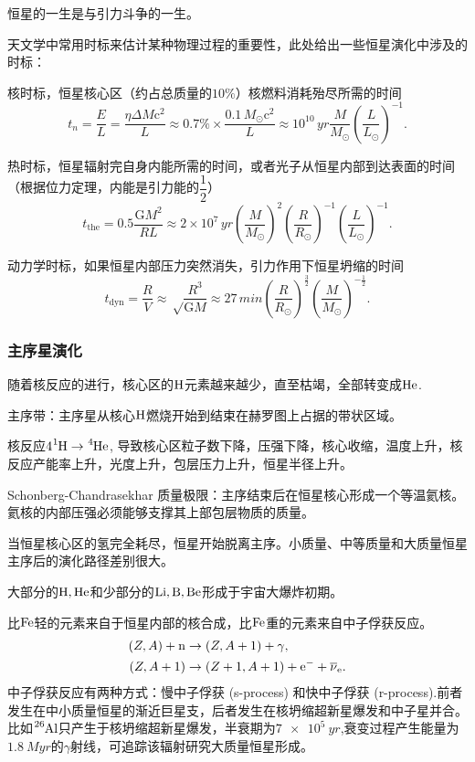 \documentclass[../天体物理基础.tex]{subfiles}
\begin{document}
恒星的一生是与引力斗争的一生。

天文学中常用时标来估计某种物理过程的重要性，此处给出一些恒星演化中涉及的时标：

核时标，恒星核心区（约占总质量的$10\%$）核燃料消耗殆尽所需的时间
\begin{equation}
t_{n}=\frac{E}{L}=\frac{\eta\Delta{}M\mathrm{c}^{2}}{L}\approx0.7\%\times\frac{0.1\,M_{\odot}\mathrm{c}^{2}}{L}\approx10^{10}\,\unit{yr}\frac{M}{\unit{M_{\odot}}}\left(\frac{L}{\unit{L_{\odot}}}\right)^{-1}.
\end{equation}

热时标，恒星辐射完自身内能所需的时间，或者光子从恒星内部到达表面的时间（根据位力定理，内能是引力能的$\dfrac{1}{2}$）
\begin{equation}
t_{\text{the}}=0.5\frac{\mathrm{G}M^{2}}{RL}\approx2\times10^{7}\,\unit{yr}\left(\frac{M}{\unit{M_{\odot}}}\right)^{2}\left(\frac{R}{\unit{R_{\odot}}}\right)^{-1}\left(\frac{L}{\unit{L_{\odot}}}\right)^{-1}.
\end{equation}

动力学时标，如果恒星内部压力突然消失，引力作用下恒星坍缩的时间
\begin{equation}
t_{\text{dyn}}=\frac{R}{V}\approx\sqrt\frac{R^{3}}{\mathrm{G}M}\approx27\,\unit{min}\left(\frac{R}{\unit{R_{\odot}}}\right)^{\frac{3}{2}}\left(\frac{M}{\unit{M_{\odot}}}\right)^{-\frac{1}{2}}.
\end{equation}

\subsubsection{主序星演化}
随着核反应的进行，核心区的$\ce{H}$元素越来越少，直至枯竭，全部转变成$\ce{He}$.

主序带：主序星从核心$\ce{H}$燃烧开始到结束在赫罗图上占据的带状区域。

核反应$4\ce{^{1}H}\to\ce{^{4}He}$, 导致核心区粒子数下降，压强下降，核心收缩，温度上升，核反应产能率上升，光度上升，包层压力上升，恒星半径上升。

Schonberg-Chandrasekhar 质量极限：主序结束后在恒星核心形成一个等温氦核。氦核的内部压强必须能够支撑其上部包层物质的质量。

当恒星核心区的氢完全耗尽，恒星开始脱离主序。小质量、中等质量和大质量恒星主序后的演化路径差别很大。

大部分的$\ce{H,He}$和少部分的$\ce{Li,B,Be}$形成于宇宙大爆炸初期。

比$\ce{Fe}$轻的元素来自于恒星内部的核合成，比$\ce{Fe}$重的元素来自中子俘获反应。
\begin{align}
\left(Z,A\right)+\ce{n}&\to\left(Z,A+1\right)+\gamma,\\
\left(Z,A+1\right)&\to\left(Z+1,A+1\right)+\ce{e-}+\overline{\nu}_{\ce{e}}.
\end{align}
中子俘获反应有两种方式：慢中子俘获 (s-process) 和快中子俘获 (r-process).前者发生在中小质量恒星的渐近巨星支，后者发生在核坍缩超新星爆发和中子星并合。比如$\ce{^{26}Al}$只产生于核坍缩超新星爆发，半衰期为$\qty{7e5}{yr}$,衰变过程产生能量为$\qty{1.8}{Myr}$的$\gamma$射线，可追踪该辐射研究大质量恒星形成。
\end{document}
